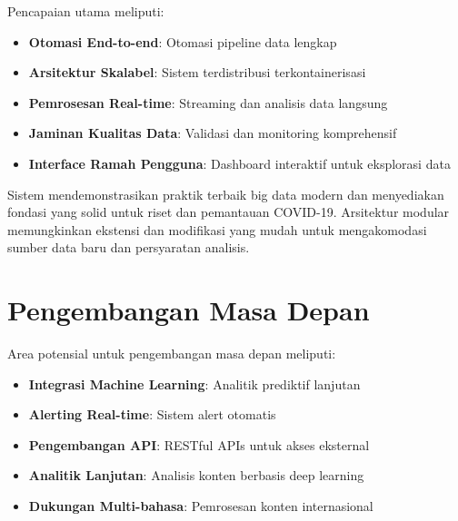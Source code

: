 \documentclass[12pt,a4paper]{article}
\begin{document}
Pencapaian utama meliputi:
\begin{itemize}
    \item \textbf{Otomasi End-to-end}: Otomasi pipeline data lengkap
    \item \textbf{Arsitektur Skalabel}: Sistem terdistribusi terkontainerisasi
    \item \textbf{Pemrosesan Real-time}: Streaming dan analisis data langsung
    \item \textbf{Jaminan Kualitas Data}: Validasi dan monitoring komprehensif
    \item \textbf{Interface Ramah Pengguna}: Dashboard interaktif untuk eksplorasi data
\end{itemize}

Sistem mendemonstrasikan praktik terbaik big data modern dan menyediakan fondasi yang solid untuk riset dan pemantauan COVID-19. Arsitektur modular memungkinkan ekstensi dan modifikasi yang mudah untuk mengakomodasi sumber data baru dan persyaratan analisis.

\section{Pengembangan Masa Depan}

Area potensial untuk pengembangan masa depan meliputi:
\begin{itemize}
    \item \textbf{Integrasi Machine Learning}: Analitik prediktif lanjutan
    \item \textbf{Alerting Real-time}: Sistem alert otomatis
    \item \textbf{Pengembangan API}: RESTful APIs untuk akses eksternal
    \item \textbf{Analitik Lanjutan}: Analisis konten berbasis deep learning
    \item \textbf{Dukungan Multi-bahasa}: Pemrosesan konten internasional
\end{itemize}
\end{document}
